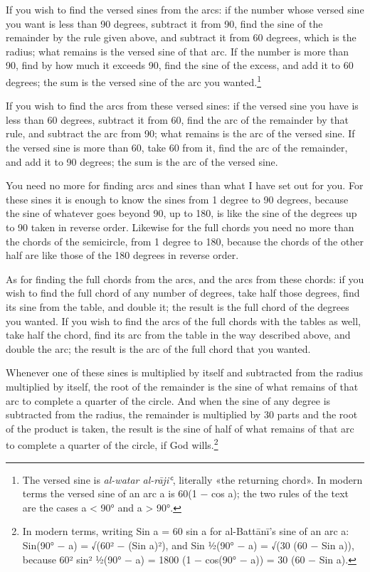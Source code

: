 \documentclass[11pt]{article}
\newcommand{\ArPage}[1]{\marginpar{\footnotesize\color{gray}Ar.\,p.\,#1}}
\begin{document}
\par If you wish to find the versed sines from the arcs: if the number whose versed sine you want is less than 90 degrees, subtract it from 90, find the sine of the remainder by the rule given above, and subtract it from 60 degrees, which is the radius; what remains is the versed sine of that arc. If the number is more than 90, find by how much it exceeds 90, find the sine of the excess, and add it to 60 degrees; the sum is the versed sine of the arc you wanted.\footnote{The versed sine is \emph{al-watar al-rājiʿ}, literally «the returning chord». In modern terms the versed sine of an arc a is 60(1 − cos a); the two rules of the text are the cases a < 90° and a > 90°.}\par
\par \ArPage{17}If you wish to find the arcs from these versed sines: if the versed sine you have is less than 60 degrees, subtract it from 60, find the arc of the remainder by that rule, and subtract the arc from 90; what remains is the arc of the versed sine. If the versed sine is more than 60, take 60 from it, find the arc of the remainder, and add it to 90 degrees; the sum is the arc of the versed sine.\par
\par You need no more for finding arcs and sines than what I have set out for you. For these sines it is enough to know the sines from 1 degree to 90 degrees, because the sine of whatever goes beyond 90, up to 180, is like the sine of the degrees up to 90 taken in reverse order. Likewise for the full chords you need no more than the chords of the semicircle, from 1 degree to 180, because the chords of the other half are like those of the 180 degrees in reverse order.\par
\par As for finding the full chords from the arcs, and the arcs from these chords: if you wish to find the full chord of any number of degrees, take half those degrees, find its sine from the table, and double it; the result is the full chord of the degrees you wanted. If you wish to find the arcs of the full chords with the tables as well, take half the chord, find its arc from the table in the way described above, and double the arc; the result is the arc of the full chord that you wanted.\par
\par Whenever one of these sines is multiplied by itself and subtracted from the radius multiplied by itself, the root of the remainder is the sine of what remains of that arc to complete a quarter of the circle. And when the sine of any degree is subtracted from the radius, the remainder is multiplied by 30 parts and the root of the product is taken, the result is the sine of half of what remains of that arc to complete a quarter of the circle, if God wills.\footnote{In modern terms, writing Sin a = 60 sin a for al-Battānī's sine of an arc a: Sin(90° − a) = √(60² − (Sin a)²), and Sin ½(90° − a) = √(30 (60 − Sin a)), because 60² sin² ½(90° − a) = 1800 (1 − cos(90° − a)) = 30 (60 − Sin a).}\par
\end{document}
